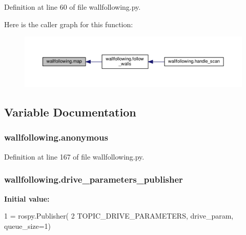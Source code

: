 Definition at line 60 of file wallfollowing.\+py.



Here is the caller graph for this function\+:
\nopagebreak
\begin{figure}[H]
\begin{center}
\leavevmode
\includegraphics[width=350pt]{namespacewallfollowing_a908b60b64e20dec7078e707a829b610d_icgraph}
\end{center}
\end{figure}




\subsection{Variable Documentation}
\subsubsection[{\texorpdfstring{anonymous}{anonymous}}]{\setlength{\rightskip}{0pt plus 5cm}wallfollowing.\+anonymous}\hypertarget{namespacewallfollowing_a005968f85117845c036ef1cbd61034bb}{}\label{namespacewallfollowing_a005968f85117845c036ef1cbd61034bb}


Definition at line 167 of file wallfollowing.\+py.

\subsubsection[{\texorpdfstring{drive\+\_\+parameters\+\_\+publisher}{drive_parameters_publisher}}]{\setlength{\rightskip}{0pt plus 5cm}wallfollowing.\+drive\+\_\+parameters\+\_\+publisher}\hypertarget{namespacewallfollowing_aa69138defbbc5f21e99db50a6b3c903f}{}\label{namespacewallfollowing_aa69138defbbc5f21e99db50a6b3c903f}
{\bfseries Initial value\+:}
\begin{DoxyCode}
1 = rospy.Publisher(
2     TOPIC\_DRIVE\_PARAMETERS, drive\_param, queue\_size=1)
\end{DoxyCode}


